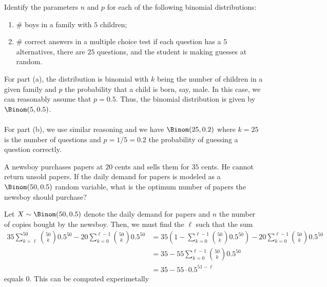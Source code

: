 \begin{problem}[Handout 8, \# 2]
  Identify the parameters \(n\) and \(p\) for each of the following
  binomial distributions:
  \begin{enumerate}[label=(\alph*),noitemsep]
  \item \(\#\) boys in a family with \(5\) children;
  \item \(\#\) correct answers in a multiple choice test if each
    question has a \(5\) alternatives, there are \(25\) questions, and the
    student is making guesses at random.
  \end{enumerate}
\end{problem}
\begin{solution}
  For part (a), the distribution is binomial with \(k\) being the number of
  children in a given family and \(p\) the probability that a child is
  born, say, male. In this case, we can reasonably assume that
  \(p=0.5\). Thus, the binomial distribution is given by
  \(\Binom(5,0.5)\).
  \\\\
  For part (b), we use similar reasoning and we have \(\Binom(25,0.2)\)
  where \(k=25\) is the number of questions and \(p=1/5=0.2\) the
  probability of guessing a question correctly.
\end{solution}
\newpage

\begin{problem}[Handout 8, \# 10]
  A newsboy purchases papers at \(20\) cents and sells them for \(35\)
  cents. He cannot return unsold papers. If the daily demand for papers is
  modeled as a \(\Binom(50,0.5)\) random variable, what is the optimum
  number of papers the newsboy should purchase?
\end{problem}
\begin{solution}
  Let \(X\sim\Binom(50,0.5)\) denote the daily demand for papers and \(n\)
  the number of copies bought by the newsboy. Then, we must find the
  \(\ell\) such that the sum
  \begin{align*}
    35\sum_{k=\ell}^{50}\binom{50}{k}0.5^{50}
    -20\sum_{k=0}^{\ell-1}\binom{50}{k}0.5^{50}
    &=35\left(1-\sum_{k=0}^{\ell-1}\binom{50}{k}0.5^{50}\right)
      -20\sum_{k=0}^{\ell-1}\binom{50}{k}0.5^{50}\\
    &=35-55\sum_{k=0}^{\ell-1}\binom{50}{k}0.5^{50}\\
    &=35-55\cdot 0.5^{51-\ell}
  \end{align*}
  equals \(0\). This can be computed experimetally
\end{solution}
\newpage

